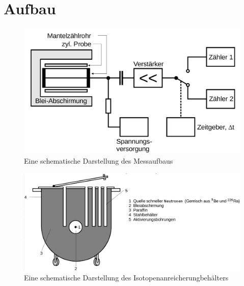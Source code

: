 \section{Aufbau}
\label{sec:Aufbau}

\begin{figure}
 \centering

 \includegraphics[width=\linewidth-70pt,height=\textheight-70pt,keepaspectratio]{content/aufbau.png}
  \caption{Eine schematische Darstellung des Messaufbaus \cite{V702}}
 \label{fig:aufbau}
\end{figure}

\begin{figure}
 \centering
 \includegraphics[width=\linewidth-70pt,height=\textheight-70pt,keepaspectratio]{content/kochtopf.png}
 \caption{Eine schematische Darstellung des Isotopenanreicherungbehälters \cite{V702}}
 \label{fig:topf}
\end{figure}


